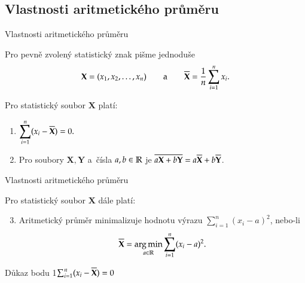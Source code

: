 \documentclass[11pt,professionalfont,aspectratio=43]{beamer}
\begin{document}
\subsection{Vlastnosti aritmetického průměru}

\begin{frame}{Vlastnosti aritmetického průměru}

Pro pevně zvolený statistický znak pišme jednoduše
\[
\mathbf{X}=(x_1,x_2,\ldots,x_n)
\qquad\text{a}\qquad
\overline{\mathbf{X}}=\frac{1}{n}\sum_{i=1}^{n}x_i.
\]

\begin{propblock}
    Pro statistický soubor $\mathbf{X}$ platí:
    \begin{enumerate}
        \item $\displaystyle \sum_{i=1}^{n}(x_i-\overline{\mathbf{X}})=0.$
        \item Pro soubory $\mathbf{X},\mathbf{Y}$ a~čísla $a,b\in\mathbb{R}$ je $\overline{a\mathbf{X}+b\mathbf{Y}}=a\overline{\mathbf{X}}+b\overline{\mathbf{Y}}$.
    \end{enumerate}
\end{propblock}

\end{frame}

\begin{frame}{Vlastnosti aritmetického průměru}

\begin{propblock}[pokračování]
    Pro statistický soubor $\mathbf{X}$ dále platí:
    \begin{enumerate}
        \setcounter{enumi}{2}
        \item Aritmetický průměr minimalizuje hodnotu výrazu $\sum_{i=1}^{n}(x_i-a)^2$,
        nebo-li
        \[\overline{\mathbf{X}}=\operatorname*{arg\,min}\limits_{a\in\mathbb{R}}\sum_{i=1}^{n}(x_i-a)^2.\]
    \end{enumerate}
\end{propblock}

\end{frame}

\begin{frame}{Důkaz bodu 1}{$\sum_{i=1}^{n}(x_i-\overline{\mathbf{X}})=0$}


\end{frame}
\end{document}
